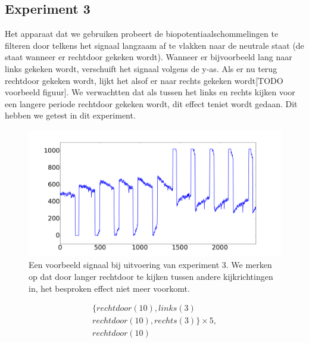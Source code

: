 \documentclass{article}
\begin{document}
\subsection{Experiment 3}

Het apparaat dat we gebruiken probeert de biopotentiaalschommelingen te filteren door telkens het signaal langzaam af te vlakken naar de neutrale staat (de staat wanneer er rechtdoor gekeken wordt). Wanneer er bijvoorbeeld lang naar links gekeken wordt, verschuift het signaal volgens de y-as. Als er nu terug rechtdoor gekeken wordt, lijkt het alsof er naar rechts gekeken wordt[TODO voorbeeld figuur]. We verwachtten dat als tussen het links en rechts kijken voor een langere periode rechtdoor gekeken wordt, dit effect teniet wordt gedaan. Dit hebben we getest in dit experiment.

\begin{figure}[h]
\centering
\includegraphics[width=\linewidth]{images/experiment3}
\caption{Een voorbeeld signaal bij uitvoering van experiment 3. We merken op dat door langer rechtdoor te kijken tussen andere kijkrichtingen in, het besproken effect niet meer voorkomt. }
\label{fig:exp2}
\end{figure}

\begin{equation}
\begin{aligned}
\label{seq:exp3}
& \{rechtdoor(10), links(3) & \\
& rechtdoor(10), rechts(3)\} \times 5,& \\
& rechtdoor(10) &
\end{aligned}
\end{equation}
\end{document}
